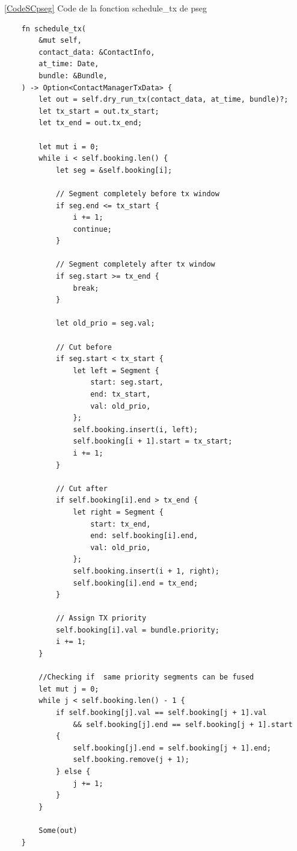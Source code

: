 \documentclass{article}
\begin{document}
\newpage
{}
\label{PsegSC}
\ref{CodeSCpseg}
Code de la fonction schedule\_tx de pseg
\begin{verbatim}
    fn schedule_tx(
        &mut self,
        contact_data: &ContactInfo,
        at_time: Date,
        bundle: &Bundle,
    ) -> Option<ContactManagerTxData> {
        let out = self.dry_run_tx(contact_data, at_time, bundle)?;
        let tx_start = out.tx_start;
        let tx_end = out.tx_end;

        let mut i = 0;
        while i < self.booking.len() {
            let seg = &self.booking[i];

            // Segment completely before tx window
            if seg.end <= tx_start {
                i += 1;
                continue;
            }

            // Segment completely after tx window
            if seg.start >= tx_end {
                break;
            }

            let old_prio = seg.val;

            // Cut before
            if seg.start < tx_start {
                let left = Segment {
                    start: seg.start,
                    end: tx_start,
                    val: old_prio,
                };
                self.booking.insert(i, left);
                self.booking[i + 1].start = tx_start;
                i += 1;
            }

            // Cut after
            if self.booking[i].end > tx_end {
                let right = Segment {
                    start: tx_end,
                    end: self.booking[i].end,
                    val: old_prio,
                };
                self.booking.insert(i + 1, right);
                self.booking[i].end = tx_end;
            }

            // Assign TX priority
            self.booking[i].val = bundle.priority;
            i += 1;
        }

        //Checking if  same priority segments can be fused
        let mut j = 0;
        while j < self.booking.len() - 1 {
            if self.booking[j].val == self.booking[j + 1].val
                && self.booking[j].end == self.booking[j + 1].start
            {
                self.booking[j].end = self.booking[j + 1].end;
                self.booking.remove(j + 1);
            } else {
                j += 1;
            }
        }

        Some(out)
    }
\end{verbatim}
\end{document}
